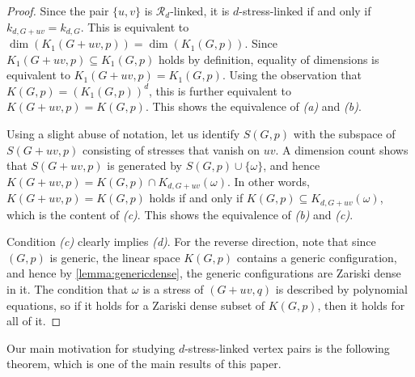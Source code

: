 \documentclass[11pt,a4paper,dvipsnames]{scrartcl}
\theoremstyle{definition}
\newcommand{\stressnullity}[1]{k_{d, #1}}
\newcommand{\strongly}[1]{${#1}$-stress-linked}
\newcommand{\stresskernel}[2]{K_{{#1},{#2}}}
\newcommand{\sharedstresskernel}[1]{K}
\begin{document}
\begin{proof}
    Since the pair $\{u,v\}$ is $\mathcal{R}_d$-linked, it is \strongly{d} if and only if $\stressnullity{G+uv} = \stressnullity{G}$. This is equivalent to $\dim(K_1(G+uv,p)) = \dim(K_1(G,p))$. Since $K_1(G+uv,p) \subseteq K_1(G,p)$ holds by definition, equality of dimensions is equivalent to $K_1(G+uv,p) = K_1(G,p)$. Using the observation that $\sharedstresskernel{d}(G,p) = {(K_1(G,p))}^d$, this is further equivalent to $\sharedstresskernel{d}(G+uv,p) = \sharedstresskernel{d}(G,p)$. This shows the equivalence of  \textit{(a)} and \textit{(b)}. 
    
    Using a slight abuse of notation, let us identify $S(G,p)$ with the subspace of $S(G+uv,p)$ consisting of stresses that vanish on $uv$. A dimension count shows that $S(G+uv,p)$ is generated by $S(G,p) \cup \{\omega\}$, and hence  $\sharedstresskernel{d}(G+uv,p) = \sharedstresskernel{d}(G,p) \cap \stresskernel{d}{G+uv}(\omega)$. In other words,  $\sharedstresskernel{d}(G+uv,p) = \sharedstresskernel{d}(G,p)$ holds if and only if $\sharedstresskernel{d}(G,p) \subseteq \stresskernel{d}{G+uv}(\omega)$, which is the content of \textit{(c)}. This shows the equivalence of \textit{(b)} and \textit{(c)}. 
    
    Condition \textit{(c)} clearly implies \textit{(d)}. For the reverse direction, note that since $(G,p)$ is generic, the linear space $\sharedstresskernel{d}(G,p)$ contains a generic configuration, and hence by \cref{lemma:genericdense}, the generic configurations are Zariski dense in it. The condition that $\omega$ is a stress of $(G+uv,q)$ is described by polynomial equations, so if it holds for a Zariski dense subset of $\sharedstresskernel{d}(G,p)$, then it holds for all of it.
\end{proof}

Our main motivation for studying \strongly{d} vertex pairs is the following theorem, which is one of the main results of this paper.
\end{document}
